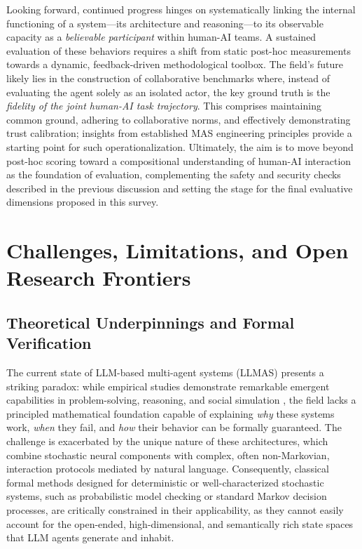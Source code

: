 \documentclass[11pt,a4paper]{article}
\begin{document}
Looking forward, continued progress hinges on systematically linking the internal functioning of a system---its architecture and reasoning---to its observable capacity as a \emph{believable participant} within human-AI teams. A sustained evaluation of these behaviors requires a shift from static post-hoc measurements towards a dynamic, feedback-driven methodological toolbox. The field's future likely lies in the construction of collaborative benchmarks where, instead of evaluating the agent solely as an isolated actor, the key ground truth is the \emph{fidelity of the joint human-AI task trajectory}. This comprises maintaining common ground, adhering to collaborative norms, and effectively demonstrating trust calibration; insights from established MAS engineering principles \cite{arxiv:1209.1428v1,arxiv:1311.5108v1} provide a starting point for such operationalization. Ultimately, the aim is to move beyond post-hoc scoring toward a compositional understanding of human-AI interaction as the foundation of evaluation, complementing the safety and security checks described in the previous discussion and setting the stage for the final evaluative dimensions proposed in this survey.


\section{Challenges, Limitations, and Open Research Frontiers}



\subsection{Theoretical Underpinnings and Formal Verification}


The current state of LLM-based multi-agent systems (LLMAS) presents a striking paradox: while empirical studies demonstrate remarkable emergent capabilities in problem-solving, reasoning, and social simulation \cite{arxiv:2406.07155v1,arxiv:2402.01680v2}, the field lacks a principled mathematical foundation capable of explaining \emph{why} these systems work, \emph{when} they fail, and \emph{how} their behavior can be formally guaranteed. The challenge is exacerbated by the unique nature of these architectures, which combine stochastic neural components with complex, often non-Markovian, interaction protocols mediated by natural language. Consequently, classical formal methods designed for deterministic or well-characterized stochastic systems, such as probabilistic model checking or standard Markov decision processes, are critically constrained in their applicability, as they cannot easily account for the open-ended, high-dimensional, and semantically rich state spaces that LLM agents generate and inhabit.
\end{document}
